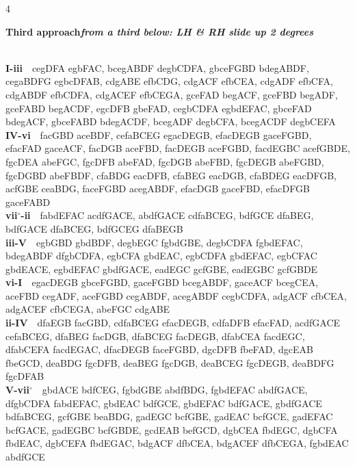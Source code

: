 \documentclass[letterpaper,12pt]{article}
\begin{document}
\begin{multicols}{4}
\noindent\colorbox{hdr5}{\begin{minipage}{\dimexpr\linewidth-2\fboxsep\relax}\raggedright\color{white}\bfseries Third approach\quad\normalfont\itshape from a third below: LH \& RH slide up 2 degrees\end{minipage}}\\[0.1mm]
\noindent\hangindent=0.25in {\color{lhcol}\bfseries I-iii}~~{\ttfamily cegDFA egbFAC, bcegABDF degbCDFA, gbceFGBD bdegABDF, cegaBDFG egbcDFAB, cdgABE efbCDG, cdgACF efbCEA, cdgADF efbCFA, cdgABDF efbCDFA, cdgACEF efbCEGA, gceFAD begACF, gceFBD begADF, gceFABD begACDF, egcDFB gbeFAD, cegbCDFA egbdEFAC, gbceFAD bdegACF, gbceFABD bdegACDF, bcegADF degbCFA, bcegACDF degbCEFA}\\[0.1mm]
\noindent\hangindent=0.25in {\color{lhcol}\bfseries IV-vi}~~{\ttfamily facGBD aceBDF, cefaBCEG egacDEGB, efacDEGB gaceFGBD, efacFAD gaceACF, facDGB aceFBD, facDEGB aceFGBD, facdEGBC acefGBDE, fgcDEA abeFGC, fgcDFB abeFAD, fgcDGB abeFBD, fgcDEGB abeFGBD, fgcDGBD abeFBDF, cfaBDG eacDFB, cfaBEG eacDGB, cfaBDEG eacDFGB, acfGBE ceaBDG, faceFGBD acegABDF, efacDGB gaceFBD, efacDFGB gaceFABD}\\[0.1mm]
\noindent\hangindent=0.25in {\color{lhcol}\bfseries vii$^\circ$-ii}~~{\ttfamily fabdEFAC acdfGACE, abdfGACE cdfaBCEG, bdfGCE dfaBEG, bdfGACE dfaBCEG, bdfGCEG dfaBEGB}\\[0.1mm]
\noindent\hangindent=0.25in {\color{lhcol}\bfseries iii-V}~~{\ttfamily egbGBD gbdBDF, degbEGC fgbdGBE, degbCDFA fgbdEFAC, bdegABDF dfgbCDFA, egbCFA gbdEAC, egbCDFA gbdEFAC, egbCFAC gbdEACE, egbdEFAC gbdfGACE, eadEGC gcfGBE, eadEGBC gcfGBDE}\\[0.1mm]
\noindent\hangindent=0.25in {\color{lhcol}\bfseries vi-I}~~{\ttfamily egacDEGB gbceFGBD, gaceFGBD bcegABDF, gaceACF bcegCEA, aceFBD cegADF, aceFGBD cegABDF, acegABDF cegbCDFA, adgACF cfbCEA, adgACEF cfbCEGA, abeFGC cdgABE}\\[0.1mm]
\noindent\hangindent=0.25in {\color{lhcol}\bfseries ii-IV}~~{\ttfamily dfaEGB facGBD, cdfaBCEG efacDEGB, cdfaDFB efacFAD, acdfGACE cefaBCEG, dfaBEG facDGB, dfaBCEG facDEGB, dfabCEA facdEGC, dfabCEFA facdEGAC, dfacDEGB faceFGBD, dgcDFB fbeFAD, dgcEAB fbeGCD, deaBDG fgcDFB, deaBEG fgcDGB, deaBCEG fgcDEGB, deaBDFG fgcDFAB}\\[0.1mm]
\noindent\hangindent=0.25in {\color{lhcol}\bfseries V-vii$^\circ$}~~{\ttfamily gbdACE bdfCEG, fgbdGBE abdfBDG, fgbdEFAC abdfGACE, dfgbCDFA fabdEFAC, gbdEAC bdfGCE, gbdEFAC bdfGACE, gbdfGACE bdfaBCEG, gcfGBE beaBDG, gadEGC bcfGBE, gadEAC bcfGCE, gadEFAC bcfGACE, gadEGBC bcfGBDE, gcdEAB befGCD, dgbCEA fbdEGC, dgbCFA fbdEAC, dgbCEFA fbdEGAC, bdgACF dfbCEA, bdgACEF dfbCEGA, fgbdEAC abdfGCE}\\[0.1mm]
\vspace{1.5mm}


\end{multicols}
\end{document}
